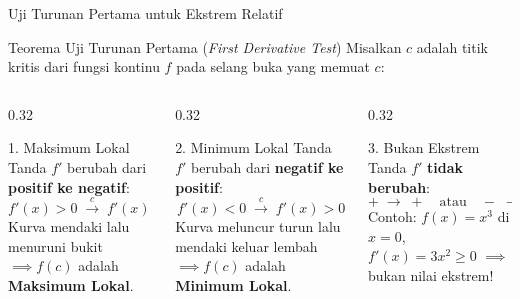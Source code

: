 \documentclass[aspectratio=169,10pt]{beamer}
\begin{document}
\begin{frame}{Uji Turunan Pertama untuk Ekstrem Relatif}
    \begin{block}{Teorema Uji Turunan Pertama (\textit{First Derivative Test})}
        Misalkan $c$ adalah titik kritis dari fungsi kontinu $f$ pada selang buka yang memuat $c$:
    \end{block}

    \vspace{0.15cm}
    \begin{columns}[T]
        \begin{column}{0.32\textwidth}
            \begin{exampleblock}{1. Maksimum Lokal}
                Tanda $f'$ berubah dari \textbf{positif ke negatif}:
                \[
                    f'(x) > 0 \;\xrightarrow{c}\; f'(x) < 0
                \]
                Kurva mendaki lalu menuruni bukit $\implies f(c)$ adalah \textbf{Maksimum Lokal}.
            \end{exampleblock}
        \end{column}

        \begin{column}{0.32\textwidth}
            \begin{exampleblock}{2. Minimum Lokal}
                Tanda $f'$ berubah dari \textbf{negatif ke positif}:
                \[
                    f'(x) < 0 \;\xrightarrow{c}\; f'(x) > 0
                \]
                Kurva meluncur turun lalu mendaki keluar lembah $\implies f(c)$ adalah \textbf{Minimum Lokal}.
            \end{exampleblock}
        \end{column}

        \begin{column}{0.32\textwidth}
            \begin{alertblock}{3. Bukan Ekstrem}
                Tanda $f'$ \textbf{tidak berubah}:
                \[
                    + \;\to\; + \quad \text{atau} \quad - \;\to\; -
                \]
                Contoh: $f(x) = x^3$ di $x=0$, $f'(x) = 3x^2 \ge 0$ $\implies$ bukan nilai ekstrem!
            \end{alertblock}
        \end{column}
    \end{columns}
\end{frame}
\end{document}

